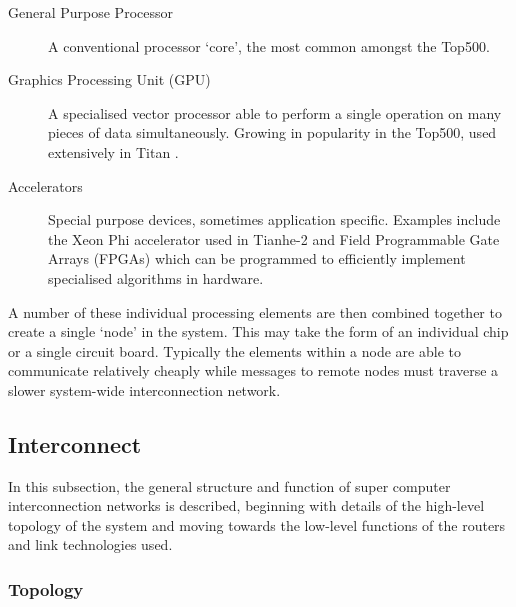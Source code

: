 			\begin{description}
				
				\item[General Purpose Processor] A conventional processor `core', the
				most common amongst the Top500.
				
				\item[Graphics Processing Unit (GPU)] A specialised vector processor
				able to perform a single operation on many pieces of data
				simultaneously. Growing in popularity in the Top500, used extensively in
				Titan \cite{bland12}.
				
				\item[Accelerators] Special purpose devices, sometimes application
				specific. Examples include the Xeon Phi accelerator used in Tianhe-2
				\cite{dongarra13} and Field Programmable Gate Arrays (FPGAs) which can
				be programmed to efficiently implement specialised algorithms in
				hardware.
				
			\end{description}
			
			A number of these individual processing elements are then combined
			together to create a single `node' in the system. This may take the form
			of an individual chip or a single circuit board. Typically the elements
			within a node are able to communicate relatively cheaply while messages to
			remote nodes must traverse a slower system-wide interconnection network.
		
		\subsection{Interconnect}
			
			In this subsection, the general structure and function of super computer
			interconnection networks is described, beginning with details of the
			high-level topology of the system and moving towards the low-level
			functions of the routers and link technologies used.
			
			\subsubsection{Topology}
				
				
